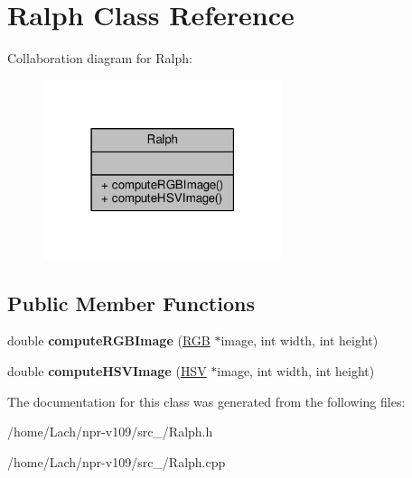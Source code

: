 \hypertarget{classRalph}{}\section{Ralph Class Reference}
\label{classRalph}


Collaboration diagram for Ralph\+:
\nopagebreak
\begin{figure}[H]
\begin{center}
\leavevmode
\includegraphics[width=198pt]{classRalph__coll__graph}
\end{center}
\end{figure}
\subsection*{Public Member Functions}
\begin{DoxyCompactItemize}
\item 
\hypertarget{classRalph_ab269d8a3ad97335078fe1dbe2c125ff6}{}\label{classRalph_ab269d8a3ad97335078fe1dbe2c125ff6} 
double {\bfseries compute\+R\+G\+B\+Image} (\hyperlink{structRGB}{R\+GB} $\ast$image, int width, int height)
\item 
\hypertarget{classRalph_a139bcc99790667b998a48719b20e9b2a}{}\label{classRalph_a139bcc99790667b998a48719b20e9b2a} 
double {\bfseries compute\+H\+S\+V\+Image} (\hyperlink{structHSV}{H\+SV} $\ast$image, int width, int height)
\end{DoxyCompactItemize}


The documentation for this class was generated from the following files\+:\begin{DoxyCompactItemize}
\item 
/home/\+Lach/npr-\/v109/src\+\_/Ralph.\+h\item 
/home/\+Lach/npr-\/v109/src\+\_/Ralph.\+cpp\end{DoxyCompactItemize}
